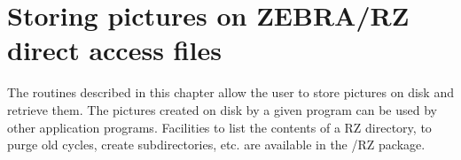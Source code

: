\chapter{Storing pictures on ZEBRA/RZ direct access files}

The routines described in this chapter allow the \HIGZ{} user to store pictures
on disk and retrieve them. The pictures created on disk by a given \HIGZ{} 
program can be used by other \HIGZ{} application programs. Facilities to list 
the contents of a RZ directory, to purge old cycles, create subdirectories, 
etc. are available in the \ZEBRA/RZ package.


